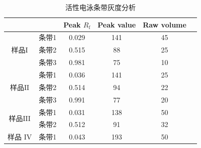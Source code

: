 \begin{table}[]
\centering
\caption{活性电泳条带灰度分析}
\label{481}
\begin{tabular}{@{}cccccl@{}}
\toprule
                     &                      & Peak $R_\text{f}$              & Peak value           & Raw volume           &  \\ \midrule
\multirow{3}{*}{样品$\mathrm{I}$} & 条带1                  & 0.029                & 141                  & 45                   &  \\
                     & 条带2                  & 0.515                & 88                   & 25                   &  \\
                     & 条带3                  & 0.981                & 75                   & 10                   &  \\  \cmidrule(lr){1-5}
\multirow{3}{*}{样品$\mathrm{II}$} & 条带1                  & 0.036                & 141                  & 25                   &  \\
                     & 条带2                  & 0.514                & 94                   & 22                   &  \\
                     & 条带3                  & 0.991                & 77                   & 20                   &  \\  \cmidrule(lr){1-5}
\multirow{2}{*}{样品$\mathrm{III}$} & 条带1                  & 0.031                & 138                  & 50                   &  \\
                     & 条带2                  & 0.512                & 91                   & 32                   &  \\  \cmidrule(lr){1-5}
样品 $\mathrm{IV}$                 & 条带1                  & 0.043                & 193                  & 50                   &  \\
 \bottomrule
\end{tabular}
\end{table}
